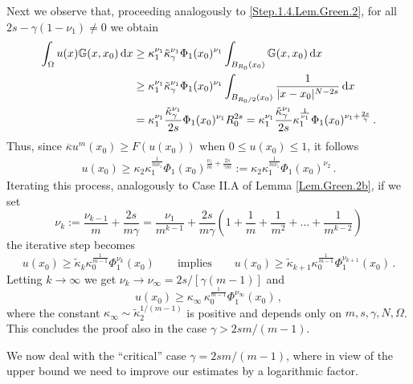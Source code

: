 \documentclass[11pt]{article}
\numberwithin{equation}{section}
\newcommand{\dx}{\,{\rm d}x}
\newcommand{\n}{F}
\newcommand{\ka}{\overline{\kappa}}
\newcommand{\K}{{\mathbb G}}
\begin{document}
Next we observe that, proceeding analogously to \eqref{Step.1.4.Lem.Green.2}, for all $2s-\gamma(1-\nu_1)\neq 0$ we obtain
\begin{equation}\label{Step.1.4.Lem.Green.3}\begin{split}
\int_{\Omega}  u(x)  \K(x,x_0)\dx
&\ge \kappa_1^{\nu_1} \tilde{\kappa}_\gamma^{\nu_1}\Phi_1(x_0)^{\nu_1} \int_{B_{R_0}(x_0)} \K(x,x_0)\dx\\
&\ge \kappa_1^{\nu_1} \tilde{\kappa}_\gamma^{\nu_1}\Phi_1(x_0)^{\nu_1} \int_{B_{R_0/2}(x_0)} \frac{1}{|x-x_0|^{N-2s}} \dx\\
&= \kappa_1^{\nu_1} \frac{\tilde{\kappa}_\gamma^{\nu_1}}{2s}\Phi_1(x_0)^{\nu_1} R_0^{2s}
= \kappa_1^{\nu_1} \frac{\tilde{\kappa}_\gamma^{\nu_1}}{2s}\kappa_1^{\frac{1}{\nu_1}}\Phi_1(x_0)^{\nu_1+\frac{2s}{\gamma}}\,.
\end{split}
\end{equation}
Thus, since $\ka u^{m}(x_0) \ge \n(u(x_0))$ when $0\le u(x_0)\le 1$, it follows
\begin{equation}\label{Lem.Green.3.3b}\begin{split}
u (x_0) \ge \kappa_2 \kappa_1^{\frac{1}{m\nu_1}}\Phi_1(x_0)^{\frac{\nu_1}{m}+\frac{2s}{\gamma m}}:=\kappa_2 \kappa_1^{\frac{1}{m\nu_1}}\Phi_1(x_0)^{\nu_2}\,.
\end{split}
\end{equation}
Iterating this process, analogously to Case II.A of Lemma \ref{Lem.Green.2b}, if we set
\[
\nu_{k}:=\frac{\nu_{k-1}}{m}+\frac{2s}{m\gamma}
=\frac{\nu_1}{m^{k-1}}+\frac{2s}{m\gamma}\left(1+\frac{1}{m}+\frac{1}{m^2}+\dots+\frac{1}{m^{k-2}}\right)
\]
the iterative step becomes
\begin{equation}\label{Step.1.9.Lem.Green.2b}
u(x_0)\ge \tilde{\kappa}_{k}\kappa_0^{\frac{1}{m-1}}\Phi_1^{\nu_k}(x_0)\qquad\mbox{implies}\qquad u(x_0)\ge \tilde{\kappa}_{k+1}\kappa_0^{\frac{1}{m-1}}\Phi_1^{\nu_{k+1}}(x_0)\,.
\end{equation}
Letting $k\to \infty$ we get $\nu_k\to \nu_\infty=2s/[\gamma(m-1)]$ and
\begin{equation}\label{Step.1.10.Lem.Green.2b}
u(x_0)\ge \kappa_\infty\, \kappa_0^{\frac{1}{m-1}}\Phi_1^{\nu_\infty}(x_0)\,,
\end{equation}
where the constant $\kappa_\infty\sim \tilde{\kappa}_2^{1/(m-1)}$ is positive and depends only on $m,s,\gamma,N,\Omega$. This concludes the proof also in the case $\gamma>2sm/(m-1)$.

We now deal with the ``critical'' case  $\gamma=2sm/(m-1)$, where in view of the upper bound we need to improve our estimates by a logarithmic factor.
\end{document}
